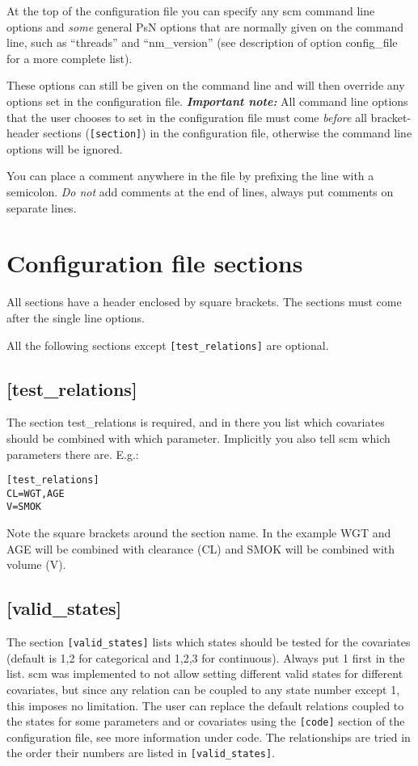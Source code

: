 At the top of the configuration file you can specify any scm command line options and \emph{some} general PsN options that are normally given on the command line, such as “threads” and “nm\_version” (see description of option config\_file for a more complete list). 

These options can still be given on the command line and will then override any options set in the configuration file. \emph{\textbf{Important note:}} All command line options that the user chooses to set in the configuration file must come \emph{before} all bracket-header sections (\verb|[section]|) in the configuration file, otherwise the command line options will be ignored.

You can place a comment anywhere in the file by prefixing the line with a semicolon. \emph{Do not} add comments at the end of lines, always put comments on separate lines.

\section{Configuration file sections}
All sections have a header enclosed by square brackets. The sections must come after the single line options.

All the following sections except \verb|[test_relations]| are optional. 

\subsection{[test\_relations]}
The section test\_relations is required, and in there you list which covariates should be combined with which parameter. Implicitly you also tell scm which parameters there are. E.g.:

\begin{verbatim}
[test_relations]
CL=WGT,AGE
V=SMOK
\end{verbatim}

Note the square brackets around the section name. In the example WGT and AGE will be combined with clearance (CL) and SMOK will be combined with volume (V).

\subsection{[valid\_states]}
The section \verb|[valid_states]| lists which states should be tested for the covariates (default is 1,2 for categorical and 1,2,3 for continuous). Always put 1 first in the list. scm was implemented to not allow setting different valid states for different covariates, but since any relation can be coupled to any state number except 1, this imposes no limitation. The user can replace the default relations coupled to the states for some parameters and or covariates using the  \verb|[code]| section of the configuration file, see more information under code. The relationships are tried in the order their numbers are listed in \verb|[valid_states]|. 

